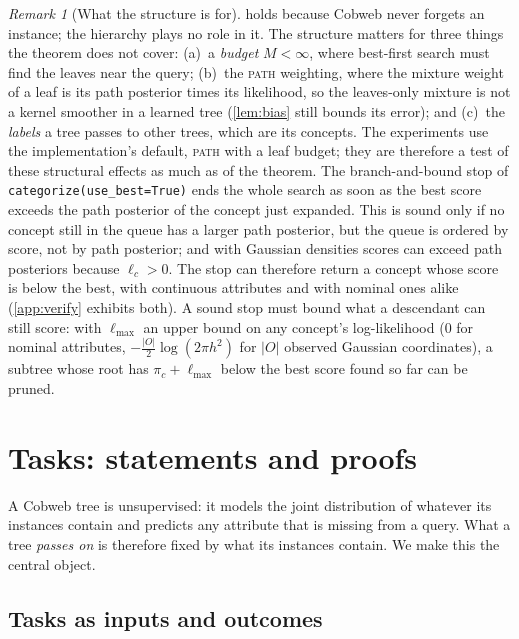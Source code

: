 \documentclass[11pt]{article}
\theoremstyle{definition}
\theoremstyle{remark}
\newtheorem{remark}[theorem]{Remark}
\begin{document}
\begin{remark}[What the structure is for]\label{rem:structure}
 holds because Cobweb never forgets an instance; the hierarchy
plays no role in it.  The structure matters for three things the theorem does not
cover: (a)~a \emph{budget} $M<\infty$, where best-first search must find the leaves
near the query; (b)~the \textsc{path} weighting, where the mixture weight of a leaf is
its path posterior times its likelihood, so the leaves-only mixture is not a kernel
smoother in a learned tree (\cref{lem:bias} still bounds its error); and (c)~the
\emph{labels} a tree passes to other trees, which are its concepts.  The experiments use
the implementation's default, \textsc{path} with a leaf budget; they are therefore a
test of these structural effects as much as of the theorem.  The branch-and-bound stop
of \texttt{categorize(use\_best=True)} ends the whole search as soon as the best score
exceeds the path posterior of the concept just expanded.  This is sound only if no concept
still in the queue has a larger path posterior, but the queue is ordered by score, not by
path posterior; and with Gaussian densities scores can exceed path posteriors because
$\ell_c>0$.  The stop can therefore return a concept whose score is below the best, with
continuous attributes and with nominal ones alike (\cref{app:verify} exhibits both).
A sound stop must bound what a descendant can still score: with $\ell_{\max}$ an upper
bound on any concept's log-likelihood ($0$ for nominal attributes,
$-\tfrac{|O|}2\log(2\pi h^2)$ for $|O|$ observed Gaussian coordinates), a subtree whose root
has $\pi_c+\ell_{\max}$ below the best score found so far can be pruned.
\end{remark}

\section{Tasks: statements and proofs}\label{sec:tasks}

A Cobweb tree is unsupervised: it models the joint distribution of whatever its
instances contain and predicts any attribute that is missing from a query.  What a tree
\emph{passes on} is therefore fixed by what its instances contain.  We make this the
central object.

\subsection{Tasks as inputs and outcomes}
\end{document}
